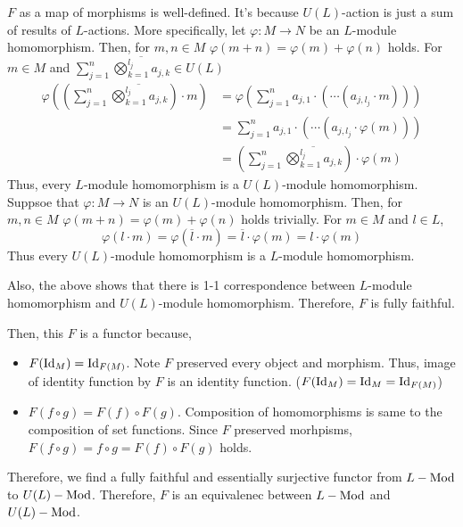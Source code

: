 \(F\) as a map of morphisms is well-defined.
It's because \(U(L)\)-action is just a sum of results of \(L\)-actions.
More specifically, let \(\varphi: M \to N\) be an \(L\)-module homomorphism.
Then, for \(m, n \in M\) \(\varphi(m + n) = \varphi(m) + \varphi(n)\) holds.
For \(m \in M\) and \(\sum_{j=1}^{n} \overline{\bigotimes_{k=1}^{l_j} a_{j,k}} \in U(L)\)
\begin{align*}
  \varphi\left(\left(\sum_{j=1}^{n} \overline{\bigotimes_{k=1}^{l_j} a_{j,k}}\right) \cdot m\right)
  &= \varphi\left(\sum_{j=1}^{n} a_{j, 1} \cdot ( \cdots ( a_{j,l_j} \cdot m ))\right)
  \\&= \sum_{j=1}^{n} a_{j, 1} \cdot ( \cdots ( a_{j,l_j} \cdot \varphi(m)))
  \\&= \left(\sum_{j=1}^{n} \overline{\bigotimes_{k=1}^{l_j} a_{j,k}}\right) \cdot \varphi(m)
\end{align*}
Thus, every \(L\)-module homomorphism is a \(U(L)\)-module homomorphism.
Suppsoe that \(\varphi: M \to N\) is an \(U(L)\)-module homomorphism.
Then, for \(m, n \in M\) \(\varphi(m + n) = \varphi(m) + \varphi(n)\) holds trivially.
For \(m \in M\) and \(l \in L\),
\[
  \varphi(l \cdot m) = \varphi(\overline{l} \cdot m)
  = \overline{l} \cdot \varphi(m) = l \cdot \varphi(m)
\]
Thus every \(U(L)\)-module homomorphism is a \(L\)-module homomorphism.

Also, the above shows that there is 1-1 correspondence between
\(L\)-module homomorphism and \(U(L)\)-module homomorphism.
Therefore, \(F\) is fully faithful.

Then, this \(F\) is a functor because,
\begin{itemize}
\item \(F(\textnormal{Id}_M) = \textnormal{Id}_{F(M)}\).
  Note \(F\) preserved every object and morphism.
  Thus, image of identity function by \(F\) is an identity function.
  (\(F(\textnormal{Id}_M) = \textnormal{Id}_M = \textnormal{Id}_{F(M)}\))
\item \(F(f \circ g) = F(f) \circ F(g)\).
  Composition of homomorphisms is same to the composition of set functions.
  Since \(F\) preserved morhpisms,
  \(F(f \circ g) = f \circ g = F(f) \circ F(g)\)
  holds.
\end{itemize}

Therefore, we find a fully faithful and essentially surjective functor
from \(L-\textnormal{Mod}\) to \(U(L)-\textnormal{Mod}\).
Therefore, \(F\) is an equivalenec between \(L-\textnormal{Mod}\) and \(U(L)-\textnormal{Mod}\).
\qedsq